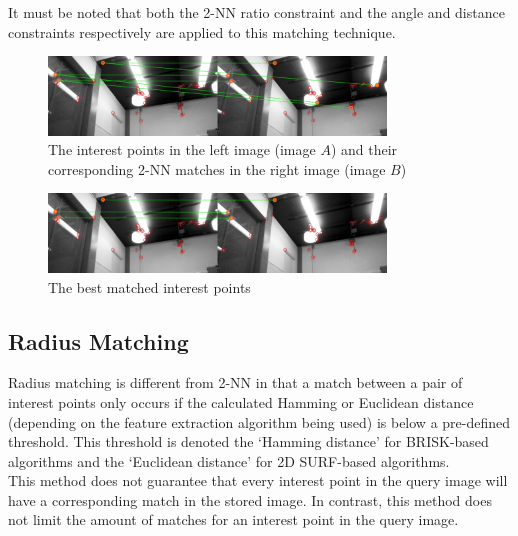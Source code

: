 It must be noted that both the 2-NN ratio constraint and the angle and distance constraints respectively are applied to this matching technique.\\

 \begin{figure}[h!] 
  \centering
    \includegraphics[width=0.8\textwidth]{../Drawings/Matching/feature_matching/dataset1_without_validation_knn.jpg}
    \caption{The interest points in the left image (image $A$) and their corresponding 2-NN matches in the right image (image $B$)}
    \label{fig:2nn_matching}
\end{figure}

 \begin{figure}[h!] 
  \centering
    \includegraphics[width=0.8\textwidth]{../Drawings/Matching/feature_matching/dataset1_without_validation_knn_best.jpg}
    \caption{The best matched interest points}
    \label{fig:2nn_best_match}
\end{figure}

\subsection{Radius Matching}
\label{sec:radius}
Radius matching is different from 2-NN in that a match between a pair of interest points only occurs if the calculated Hamming or Euclidean distance (depending on the feature extraction algorithm being used) is below a pre-defined threshold. This threshold is denoted the `Hamming distance' for BRISK-based algorithms and the `Euclidean distance' for 2D SURF-based algorithms. \\

This method does not guarantee that every interest point in the query image will have a corresponding match in the stored image. In contrast, this method does not limit the amount of matches for an interest point in the query image.\\

